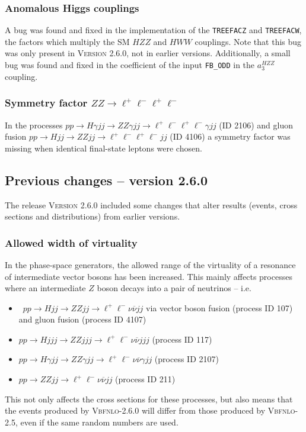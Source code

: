 \documentclass[english,12pt]{article}
\begin{document}
\subsubsection{Anomalous Higgs couplings}

A bug was found and fixed in the implementation of the {\tt TREEFACZ} and {\tt TREEFACW}, 
the factors which multiply the SM $HZZ$ and $HWW$ couplings.  Note that this bug was only 
present in \textsc{Version 2.6.0}, not in earlier versions.  Additionally, a small bug was 
found and fixed in the coefficient of the input {\tt FB\_ODD} in the $a_{3}^{HZZ}$ coupling.

\subsubsection{Symmetry factor $ZZ \rightarrow \ell^{+} \ell^{-} \ell^{+} \ell^{-}$ }

In the processes $pp \rightarrow H \gamma jj \rightarrow ZZ \gamma jj \rightarrow \ell^{+} 
\ell^{-} \ell^{+} \ell^{-} \gamma jj$ (ID 2106) and gluon fusion $pp \rightarrow H jj \rightarrow 
ZZ jj \rightarrow \ell^{+} \ell^{-} \ell^{+} \ell^{-} jj $ (ID 4106) a symmetry factor was missing 
when identical final-state leptons were chosen.



\subsection{Previous changes -- version 2.6.0}

The release \textsc{Version 2.6.0} included some changes 
that alter results (events, cross sections and distributions) from earlier versions.

\subsubsection{Allowed width of virtuality}
In the phase-space generators, the allowed range of the virtuality of a resonance of intermediate vector bosons has been increased.  This mainly affects processes where an intermediate $Z$ boson decays into a pair of neutrinos -- i.e.
\begin{itemize}
 \item \ $pp \rightarrow Hjj \rightarrow ZZjj \rightarrow \ell^{+} \ell^{-} \nu \overline{\nu} jj$ via vector boson fusion (process ID 107) and gluon fusion (process ID 4107)
 \item $pp \rightarrow Hjjj \rightarrow ZZjjj \rightarrow \ell^{+} \ell^{-} \nu \overline{\nu} jjj$ (process ID 117)
 \item $pp \rightarrow H\gamma jj \rightarrow ZZ\gamma jj \rightarrow \ell^{+} \ell^{-} \nu \overline{\nu} \gamma jj$ (process ID 2107)
 \item $pp \rightarrow ZZjj \rightarrow \ell^{+} \ell^{-} \nu \overline{\nu} jj$ (process ID 211)
\end{itemize}
This not only affects the cross sections for these processes, but also means that the events produced by \textsc{Vbfnlo-2.6.0} will differ from those produced by \textsc{Vbfnlo-2.5}, even if the same random numbers are used.
\end{document}
